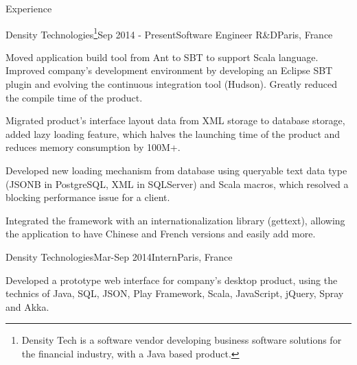 \documentclass{resume} %
\begin{document}

\begin{rSection}{Experience}

\begin{rSubsection}{Density Technologies\footnote{Density Tech is a software vendor developing business software solutions for the financial industry, with a Java based product.}}{Sep 2014 - Present}{Software Engineer R\&D}{Paris, France}
\item Moved application build tool from Ant to SBT to support Scala language. Improved company's development environment by developing an Eclipse SBT plugin and evolving the continuous integration tool (Hudson). Greatly reduced the compile time of the product.
\item Migrated product's interface layout data from XML storage to database storage, added lazy loading feature, which halves the launching time of the product and reduces memory consumption by 100M+.
\item Developed new loading mechanism from database using queryable text data type (JSONB in PostgreSQL, XML in SQLServer) and Scala macros, which resolved a blocking performance issue for a client.
\item Integrated the framework with an internationalization library (gettext), allowing the application to have Chinese and French versions and easily add more.
\end{rSubsection}

\begin{rSubsection}{Density Technologies}{Mar-Sep 2014}{Intern}{Paris, France}
\item Developed a prototype web interface for company's desktop product, using the technics of Java, SQL, JSON, Play Framework, Scala, JavaScript, jQuery, Spray and Akka.
\end{rSubsection}

\end{rSection}


 
\end{document}
